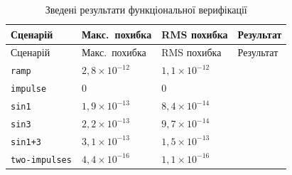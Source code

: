 \documentclass[
]{article}
\begin{document}
\begin{longtable}[]{@{}
  >{\raggedright\arraybackslash}p{}
  >{\raggedright\arraybackslash}p{}
  >{\raggedright\arraybackslash}p{}
  >{\raggedright\arraybackslash}p{}@{}}
\caption{Зведені результати функціональної верифікації}\tabularnewline
\toprule\noalign{}
\begin{minipage}[b]{\linewidth}\raggedright
Сценарій
\end{minipage} & \begin{minipage}[b]{\linewidth}\raggedright
Макс.~похибка
\end{minipage} & \begin{minipage}[b]{\linewidth}\raggedright
RMS похибка
\end{minipage} & \begin{minipage}[b]{\linewidth}\raggedright
Результат
\end{minipage} \\
\midrule\noalign{}
\endfirsthead
\toprule\noalign{}
\begin{minipage}[b]{\linewidth}\raggedright
Сценарій
\end{minipage} & \begin{minipage}[b]{\linewidth}\raggedright
Макс.~похибка
\end{minipage} & \begin{minipage}[b]{\linewidth}\raggedright
RMS похибка
\end{minipage} & \begin{minipage}[b]{\linewidth}\raggedright
Результат
\end{minipage} \\
\midrule\noalign{}
\endhead
\bottomrule\noalign{}
\endlastfoot
\texttt{ramp} & \(2,8 \times 10^{- 12}\) & \(1,1 \times 10^{- 12}\) & \\
\texttt{impulse} & \(0\) & \(0\) & \\
\texttt{sin1} & \(1,9 \times 10^{- 13}\) & \(8,4 \times 10^{- 14}\) & \\
\texttt{sin3} & \(2,2 \times 10^{- 13}\) & \(9,7 \times 10^{- 14}\) & \\
\texttt{sin1+3} & \(3,1 \times 10^{- 13}\) & \(1,5 \times 10^{- 13}\)
& \\
\texttt{two-impulses} & \(4,4 \times 10^{- 16}\) &
\(1,1 \times 10^{- 16}\) & \\
\end{longtable}
\end{document}
